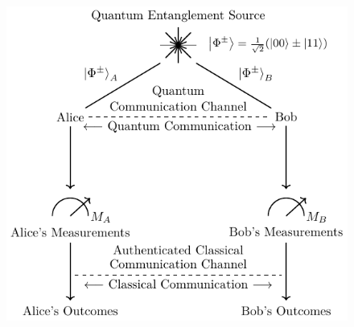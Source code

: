 \documentclass{beamer}
\begin{document}
\begin{frame}
\begin{figure}
\begin{minipage}{0.5\textwidth}
                    \includegraphics[width=0.95\linewidth, height=0.5\textheight]{figures/pdf/entanglement-based-qkd-protocol.pdf}
                    \vspace{-1.5ex}
                    \caption{\color{blue}{Figure 1b: }}
                    \label{fig:entanglement-based-qkd-protocol}
                \end{minipage}
            \end{figure}
   
		\end{frame}
\end{document}
